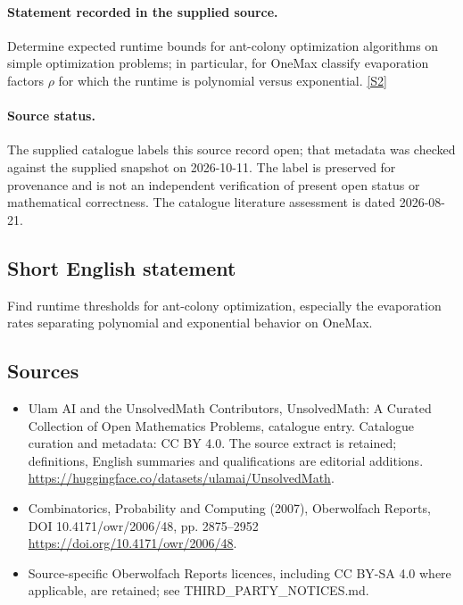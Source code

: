 \documentclass[11pt]{article}
\begin{document}
\paragraph{Statement recorded in the supplied source.}
Determine expected runtime bounds for ant-colony optimization algorithms on simple optimization problems; in particular, for OneMax classify evaporation factors $\rho$ for which the runtime is polynomial versus exponential. \href{https://doi.org/10.4171/owr/2006/48}{[S2]}
\paragraph{Source status.}
The supplied catalogue labels this source record open; that metadata was checked against the supplied snapshot on 2026-10-11. The label is preserved for provenance and is not an independent verification of present open status or mathematical correctness. The catalogue literature assessment is dated 2026-08-21.
\subsection{Short English statement}
Find runtime thresholds for ant-colony optimization, especially the evaporation rates separating polynomial and exponential behavior on OneMax.
\subsection{Sources}
\begin{itemize}
\item[S1] Ulam AI and the UnsolvedMath Contributors, UnsolvedMath: A Curated Collection of Open Mathematics Problems, catalogue entry. Catalogue curation and metadata: CC BY 4.0. The source extract is retained; definitions, English summaries and qualifications are editorial additions.
\url{https://huggingface.co/datasets/ulamai/UnsolvedMath}.
\item[S2] Combinatorics, Probability and Computing (2007), Oberwolfach Reports, DOI 10.4171/owr/2006/48, pp. 2875--2952
\url{https://doi.org/10.4171/owr/2006/48}.
\item Source-specific Oberwolfach Reports licences, including CC BY-SA 4.0 where applicable, are retained; see THIRD\_PARTY\_NOTICES.md.
\end{itemize}
\end{document}
